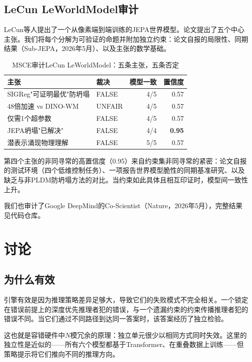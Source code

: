\documentclass[11pt,a4paper]{ctexart}
\begin{document}
\subsection{LeCun LeWorldModel审计}

LeCun等人提出了一个从像素端到端训练的JEPA世界模型。论文提出了五个中心主张。我们将每个分解为可验证的命题并附加独立约束：论文自报的局限性、同期结果（Sub-JEPA，2026年5月）、以及主张的数学基础。

\begin{table}[ht]
\centering
\caption{MSCE审计LeCun LeWorldModel：五条主张，五条否定}
\begin{tabular}{>{\raggedright\arraybackslash}p{4.5cm}lrr}
\toprule
\textbf{主张} & \textbf{裁决} & \textbf{模型一致} & \textbf{置信度} \\
\midrule
SIGReg"可证明最优"防坍塌 & FALSE & 4/5 & 0.57 \\
48倍加速 vs DINO-WM & UNFAIR & 4/5 & 0.57 \\
仅需1个超参数 & FALSE & 4/5 & 0.57 \\
JEPA坍塌"已解决" & FALSE & 4/4 & \textbf{0.95} \\
潜表示涌现物理理解 & FALSE & 5/5 & 0.57 \\
\bottomrule
\end{tabular}
\end{table}

第四个主张的非同寻常的高置信度（0.95）来自约束集非同寻常的紧密：论文自报的测试环境（四个低维控制任务）、一项报告世界模型脆性的同期基准研究、以及缺乏与非PLDM防坍塌方法的对比。当约束如此具体且相互印证时，模型间一致性上升。

我们也审计了Google DeepMind的Co-Scientist（Nature，2026年5月），完整结果见代码仓库。

\section{讨论}

\subsection{为什么有效}

引擎有效是因为推理策略差异足够大，导致它们的失败模式不完全相关。一个锁定在错误前提上的深度优先推理者犯的错误，与一个遗漏约束的约束传播推理者犯的错误不同。当它们通过不同路径到达同一答案时，该答案经历了独立检验。

这也就是容错硬件中$N$模冗余的原理：独立单元很少以相同方式同时失效。这里的独立性是近似的——所有六个模型都基于Transformer、在重叠数据上训练——但策略提示将它们推向不同的推理方向。
\end{document}
